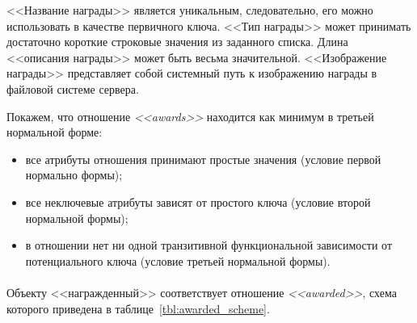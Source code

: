 <<Название награды>> является уникальным, следовательно, его можно использовать в качестве первичного ключа.
<<Тип награды>> может принимать достаточно короткие строковые значения из заданного списка.
Длина <<описания награды>> может быть весьма значительной.
<<Изображение награды>> представляет собой системный путь к изображению награды в файловой системе сервера.

Покажем, что отношение \textit{<<awards>>} находится как минимум в третьей нормальной форме:
\begin{itemize}
\item
  все атрибуты отношения принимают простые значения (условие первой нормально формы);
\item
  все неключевые атрибуты зависят от простого ключа
  (условие второй нормальной формы); 
\item
  в отношении нет ни одной транзитивной функциональной зависимости от потенциального ключа
(условие третьей нормальной формы).
\end{itemize}

\paragraph{}
Объекту <<награжденный>> соответствует отношение \textit{<<awarded>>},
схема которого приведена в таблице~\ref{tbl:awarded_scheme}.


